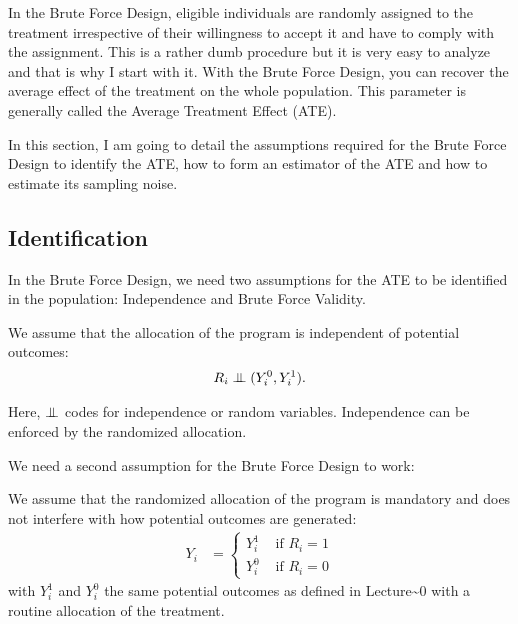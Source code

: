 \documentclass[]{book}
\newcommand\Ind{\protect\mathpalette{\protect\independenT}{\perp}}
\def\independenT#1#2{\mathrel{\setbox0\hbox{$#1#2$}\copy0\kern-\wd0\mkern4mu\box0}}
\theoremstyle{definition}
\theoremstyle{definition}
\theoremstyle{definition}
\theoremstyle{remark}
\let\BeginKnitrBlock\begin \let\EndKnitrBlock\end
\begin{document}
In the Brute Force Design, eligible individuals are randomly assigned to the treatment irrespective of their willingness to accept it and have to comply with the assignment.
This is a rather dumb procedure but it is very easy to analyze and that is why I start with it.
With the Brute Force Design, you can recover the average effect of the treatment on the whole population.
This parameter is generally called the Average Treatment Effect (ATE).

In this section, I am going to detail the assumptions required for the Brute Force Design to identify the ATE, how to form an estimator of the ATE and how to estimate its sampling noise.

\hypertarget{identification}{%
\subsection{Identification}\label{identification}}

In the Brute Force Design, we need two assumptions for the ATE to be identified in the population: Independence and Brute Force Validity.

\BeginKnitrBlock{definition}[Independence]
\protect\hypertarget{def:independence}{}{\label{def:independence} \iffalse (Independence) \fi{} }We assume that the allocation of the program is independent of potential outcomes:
\begin{align*}
  R_i\Ind(Y_i^0,Y_i^1).
\end{align*}
\EndKnitrBlock{definition}

Here, \(\Ind\) codes for independence or random variables.
Independence can be enforced by the randomized allocation.

We need a second assumption for the Brute Force Design to work:

\BeginKnitrBlock{definition}[Brute Force Validity]
\protect\hypertarget{def:BF}{}{\label{def:BF} \iffalse (Brute Force Validity) \fi{} }We assume that the randomized allocation of the program is mandatory and does not interfere with how potential outcomes are generated:
\begin{align*}
Y_i & = 
  \begin{cases}
    Y_i^1 & \text{ if } R_i=1  \\
    Y_i^0 & \text{ if } R_i=0      
  \end{cases}
\end{align*}
with \(Y_i^1\) and \(Y_i^0\) the same potential outcomes as defined in Lecture\textasciitilde{}0 with a routine allocation of the treatment.
\EndKnitrBlock{definition}
\end{document}

